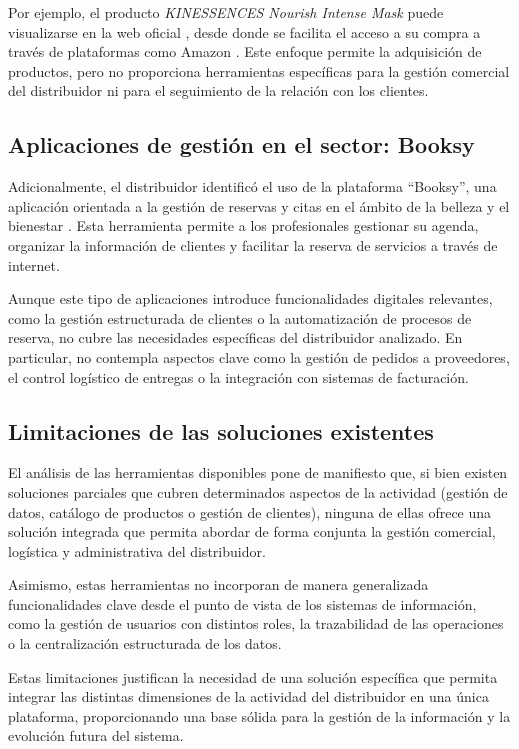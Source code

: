 Por ejemplo, el producto \textit{KINESSENCES Nourish Intense Mask} puede visualizarse en la web oficial \cite{kincosmetics_producto}, desde donde se facilita el acceso a su compra a través de plataformas como Amazon \cite{amazon_producto}. Este enfoque permite la adquisición de productos, pero no proporciona herramientas específicas para la gestión comercial del distribuidor ni para el seguimiento de la relación con los clientes.

\subsection{Aplicaciones de gestión en el sector: Booksy}

Adicionalmente, el distribuidor identificó el uso de la plataforma ``Booksy'', una aplicación orientada a la gestión de reservas y citas en el ámbito de la belleza y el bienestar \cite{booksy}. Esta herramienta permite a los profesionales gestionar su agenda, organizar la información de clientes y facilitar la reserva de servicios a través de internet.

Aunque este tipo de aplicaciones introduce funcionalidades digitales relevantes, como la gestión estructurada de clientes o la automatización de procesos de reserva, no cubre las necesidades específicas del distribuidor analizado. En particular, no contempla aspectos clave como la gestión de pedidos a proveedores, el control logístico de entregas o la integración con sistemas de facturación.

\subsection{Limitaciones de las soluciones existentes}

El análisis de las herramientas disponibles pone de manifiesto que, si bien existen soluciones parciales que cubren determinados aspectos de la actividad (gestión de datos, catálogo de productos o gestión de clientes), ninguna de ellas ofrece una solución integrada que permita abordar de forma conjunta la gestión comercial, logística y administrativa del distribuidor.

Asimismo, estas herramientas no incorporan de manera generalizada funcionalidades clave desde el punto de vista de los sistemas de información, como la gestión de usuarios con distintos roles, la trazabilidad de las operaciones o la centralización estructurada de los datos.

Estas limitaciones justifican la necesidad de una solución específica que permita integrar las distintas dimensiones de la actividad del distribuidor en una única plataforma, proporcionando una base sólida para la gestión de la información y la evolución futura del sistema.
